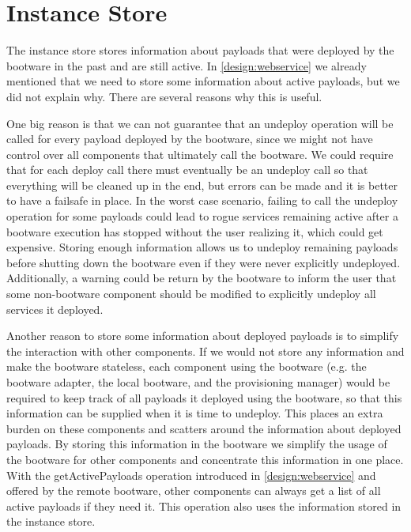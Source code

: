 \section{Instance Store}
\label{design:instancestore}

The instance store stores information about payloads that were deployed by the bootware in the past and are still active.
In \autoref{design:webservice} we already mentioned that we need to store some information about active payloads, but we did not explain why.
There are several reasons why this is useful.

One big reason is that we can not guarantee that an undeploy operation will be called for every payload deployed by the bootware, since we might not have control over all components that ultimately call the bootware.
We could require that for each deploy call there must eventually be an undeploy call so that everything will be cleaned up in the end, but errors can be made and it is better to have a failsafe in place.
In the worst case scenario, failing to call the undeploy operation for some payloads could lead to rogue services remaining active after a bootware execution has stopped without the user realizing it, which could get expensive.
Storing enough information allows us to undeploy remaining payloads before shutting down the bootware even if they were never explicitly undeployed.
Additionally, a warning could be return by the bootware to inform the user that some non-bootware component should be modified to explicitly undeploy all services it deployed.

Another reason to store some information about deployed payloads is to simplify the interaction with other components.
If we would not store any information and make the bootware stateless, each component using the bootware (e.g. the bootware adapter, the local bootware, and the provisioning manager) would be required to keep track of all payloads it deployed using the bootware, so that this information can be supplied when it is time to undeploy.
This places an extra burden on these components and scatters around the information about deployed payloads.
By storing this information in the bootware we simplify the usage of the bootware for other components and concentrate this information in one place.
With the getActivePayloads operation introduced in \autoref{design:webservice} and offered by the remote bootware, other components can always get a list of all active payloads if they need it.
This operation also uses the information stored in the instance store.

